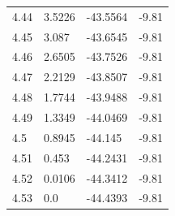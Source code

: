 \begin{tabular}{llll}
4.44 & 3.5226 & -43.5564 & -9.81 \\
4.45 & 3.087 & -43.6545 & -9.81 \\
4.46 & 2.6505 & -43.7526 & -9.81 \\
4.47 & 2.2129 & -43.8507 & -9.81 \\
4.48 & 1.7744 & -43.9488 & -9.81 \\
4.49 & 1.3349 & -44.0469 & -9.81 \\
4.5 & 0.8945 & -44.145 & -9.81 \\
4.51 & 0.453 & -44.2431 & -9.81 \\
4.52 & 0.0106 & -44.3412 & -9.81 \\
4.53 & 0.0 & -44.4393 & -9.81 \\
\bottomrule
\end{tabular}
